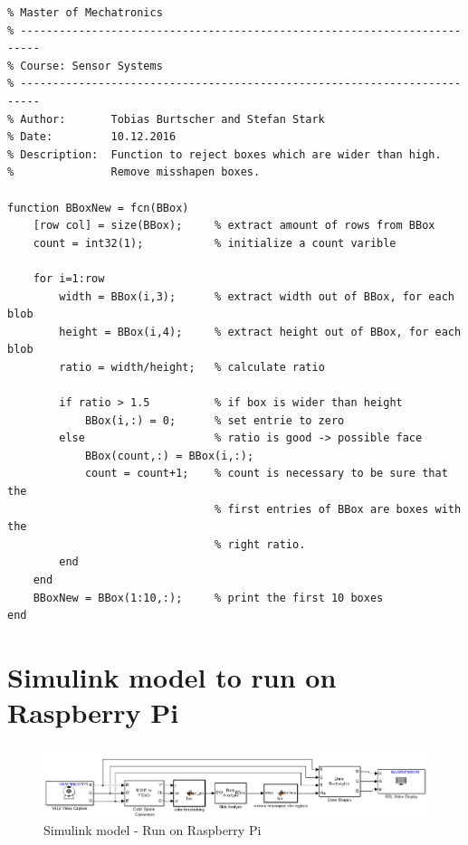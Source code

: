 \documentclass[Bachelorarbeit.tex]{subfiles}
\begin{document}
\begin{lstlisting}[caption=MATLAB function block - remove misshapen skin regions]
% University of Applied Science Vorarlberg
% Master of Mechatronics
% -------------------------------------------------------------------------
% Course: Sensor Systems
% -------------------------------------------------------------------------
% Author:       Tobias Burtscher and Stefan Stark
% Date:         10.12.2016
% Description:  Function to reject boxes which are wider than high.
%               Remove misshapen boxes.

function BBoxNew = fcn(BBox)
    [row col] = size(BBox);     % extract amount of rows from BBox
    count = int32(1);           % initialize a count varible
    
    for i=1:row
        width = BBox(i,3);      % extract width out of BBox, for each blob
        height = BBox(i,4);     % extract height out of BBox, for each blob             
        ratio = width/height;   % calculate ratio
        
        if ratio > 1.5          % if box is wider than height
            BBox(i,:) = 0;      % set entrie to zero
        else                    % ratio is good -> possible face
            BBox(count,:) = BBox(i,:); 
            count = count+1;    % count is necessary to be sure that the 
                                % first entries of BBox are boxes with the
                                % right ratio.
        end
    end
    BBoxNew = BBox(1:10,:);     % print the first 10 boxes
end
\end{lstlisting}


\newpage
\section{Simulink model to run on Raspberry Pi}
\begin{figure}[!h]
\centering
\includegraphics[width=14cm]{./img/simulink/Simulink_RaspberryPi.PNG} 
\caption{Simulink model - Run on Raspberry Pi}
\end{figure}
\end{document}
